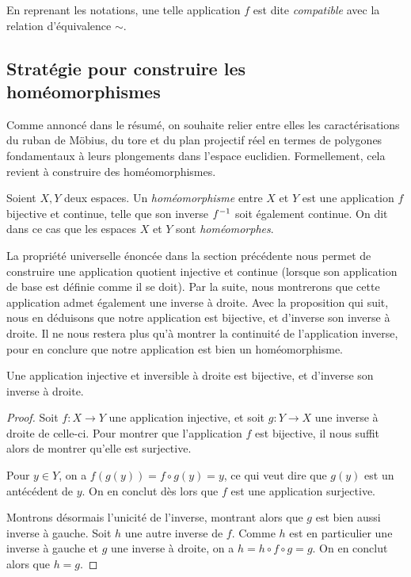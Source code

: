 \documentclass[hidelinks, 10pt]{article}
\begin{document}
\begin{definition}
En reprenant les notations, une telle application $f$ est dite \emph{compatible} avec la relation d'équivalence $\sim$.
\end{definition}

\subsection{Stratégie pour construire les homéomorphismes}

Comme annoncé dans le résumé, on souhaite relier entre elles les caractérisations du ruban de Möbius, du tore et du plan projectif réel en termes de polygones fondamentaux à leurs plongements dans l'espace euclidien. Formellement, cela revient à construire des homéomorphismes.

\begin{definition}
Soient $X,Y$ deux espaces. Un \emph{homéomorphisme} entre $X$ et $Y$ est une application $f$ bijective et continue, telle que son inverse $f^{-1}$ soit également continue. On dit dans ce cas que les espaces $X$ et $Y$ sont \emph{homéomorphes}.
\end{definition}

La propriété universelle énoncée dans la section précédente nous permet de construire une application quotient injective et continue (lorsque son application de base est définie comme il se doit). Par la suite, nous montrerons que cette application admet également une inverse à droite. Avec la proposition qui suit, nous en déduisons que notre application est bijective, et d'inverse son inverse à droite. Il ne nous restera plus qu'à montrer la continuité de l'application inverse, pour en conclure que notre application est bien un homéomorphisme.

\begin{proposition}\label{prop:inj+inv=bij}
Une application injective et inversible à droite est bijective, et d'inverse son inverse à droite.
\end{proposition}

\begin{proof}
Soit $f:X\to Y$ une application injective, et soit $g:Y\to X$ une inverse à droite de celle-ci. Pour montrer que l'application $f$ est bijective, il nous suffit alors de montrer qu'elle est surjective.

\bigskip Pour $y\in Y$, on a $f(g(y))=f\circ g(y)=y$, ce qui veut dire que $g(y)$ est un antécédent de $y$. On en conclut dès lors que $f$ est une application surjective.

\bigskip Montrons désormais l'unicité de l'inverse, montrant alors que $g$ est bien aussi inverse à gauche. Soit $h$ une autre inverse de $f$. Comme $h$ est en particulier une inverse à gauche et $g$ une inverse à droite, on a $h=h\circ f\circ g=g$. On en conclut alors que $h=g$.
\end{proof}
\end{document}
